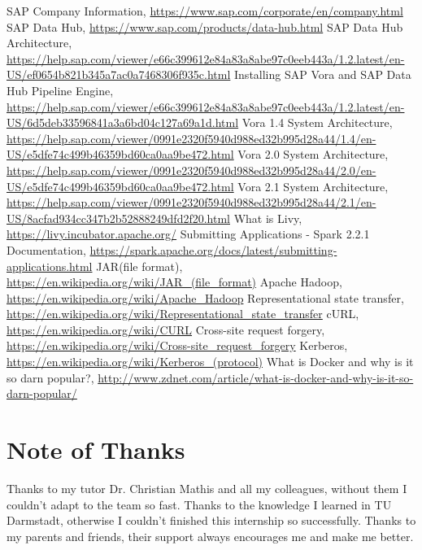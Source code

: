 \documentclass[article,colorback,accentcolor=tud4c]{tudreport}
\begin{document}
\begin{thebibliography}{9}
	SAP Company Information, \url{https://www.sap.com/corporate/en/company.html}
	SAP Data Hub, \url{https://www.sap.com/products/data-hub.html}
	SAP Data Hub Architecture, \url{https://help.sap.com/viewer/e66c399612e84a83a8abe97c0eeb443a/1.2.latest/en-US/ef0654b821b345a7ac0a7468306f935c.html}
	Installing SAP Vora and SAP Data Hub Pipeline Engine, \url{https://help.sap.com/viewer/e66c399612e84a83a8abe97c0eeb443a/1.2.latest/en-US/6d5deb33596841a3a6bd04c127a69a1d.html}
	Vora 1.4 System Architecture, \url{https://help.sap.com/viewer/0991e2320f5940d988ed32b995d28a44/1.4/en-US/e5dfe74c499b46359bd60ca0aa9be472.html}
	Vora 2.0 System Architecture, \url{https://help.sap.com/viewer/0991e2320f5940d988ed32b995d28a44/2.0/en-US/e5dfe74c499b46359bd60ca0aa9be472.html}
	Vora 2.1 System Architecture, \url{https://help.sap.com/viewer/0991e2320f5940d988ed32b995d28a44/2.1/en-US/8acfad934cc347b2b52888249dfd2f20.html}
	What is Livy, \url{https://livy.incubator.apache.org/}
	Submitting Applications - Spark 2.2.1 Documentation, \url{https://spark.apache.org/docs/latest/submitting-applications.html}
	JAR(file format), \url{https://en.wikipedia.org/wiki/JAR_(file_format)}
	Apache Hadoop, \url{https://en.wikipedia.org/wiki/Apache_Hadoop}
	Representational state transfer,  \url{https://en.wikipedia.org/wiki/Representational_state_transfer}
	cURL, \url{https://en.wikipedia.org/wiki/CURL}
	Cross-site request forgery, \url{https://en.wikipedia.org/wiki/Cross-site_request_forgery}
	Kerberos, \url{https://en.wikipedia.org/wiki/Kerberos_(protocol)}
	What is Docker and why is it so darn popular?, \url{http://www.zdnet.com/article/what-is-docker-and-why-is-it-so-darn-popular/}
\end{thebibliography}

\section*{Note of Thanks}
Thanks to my tutor Dr. Christian Mathis and all my colleagues, without them I couldn't adapt to the team so fast. Thanks to the knowledge I learned in TU Darmstadt, otherwise I couldn't finished this internship so successfully. Thanks to my parents and friends, their support always encourages me and make me better.

\listoffigures{}
  
\end{document}

